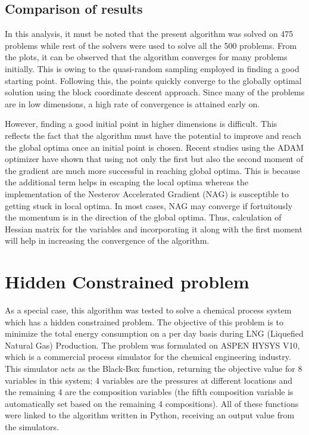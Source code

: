 \subsection{Comparison of results}
In this analysis, it must be noted that the present algorithm was solved on 475 problems while rest of the solvers were used to solve all the 500 problems. From the plots, it can be observed that the algorithm converges for many problems initially. This is owing to the quasi-random sampling employed in finding a good starting point. Following this, the points quickly converge to the globally optimal solution using the block coordinate descent approach. Since many of the problems are in low dimensions, a high rate of convergence is attained early on. 

\bigskip
\noindent
However, finding a good initial point in higher dimensions is difficult. This reflects the fact that the algorithm must have the potential to improve and reach the global optima once an initial point is chosen. Recent studies using the ADAM optimizer have shown that using not only the first but also the second moment of the gradient are much more successful in reaching global optima. This is because the additional term helps in escaping the local optima whereas the implementation of the Nesterov Accelerated Gradient (NAG) is susceptible to getting stuck in local optima. In most cases, NAG may converge if fortuitously the momentum is in the direction of the global optima. Thus, calculation of Hessian matrix for the variables and incorporating it along with the first moment will help in increasing the convergence of the algorithm.

\section{Hidden Constrained problem}
As a special case, this algorithm was tested to solve a chemical process system which has a hidden constrained problem. The objective of this problem is to minimize the total energy consumption on a per day basis during LNG (Liquefied Natural Gas) Production. The problem was formulated on ASPEN HYSYS V10, which is a commercial process simulator for the chemical engineering industry. This simulator acts as the Black-Box function, returning the objective value for 8 variables in this system; 4 variables are the pressures at different locations and the remaining 4 are the composition variables (the fifth composition variable is automatically set based on the remaining 4 compositions). All of these functions were linked to the algorithm written in Python, receiving an output value from the simulators.

